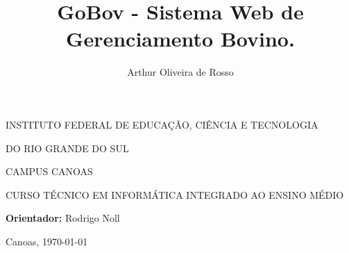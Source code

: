 %
%
\author{Arthur Oliveira de Rosso}
\title{GoBov - Sistema Web de Gerenciamento Bovino.}

\makeatletter
	\begin{center}

		INSTITUTO FEDERAL DE EDUCAÇÃO, CIÊNCIA E TECNOLOGIA

		DO RIO GRANDE DO SUL

		CAMPUS CANOAS

		CURSO TÉCNICO EM INFORMÁTICA INTEGRADO AO ENSINO MÉDIO

		\vfill
		\vfill

		\@author

		\vfill

		\textbf{\@title}

		\vfill

		\textbf{Orientador:} Rodrigo Noll

		\vfill

		Canoas, \today

	\end{center}
\makeatother
